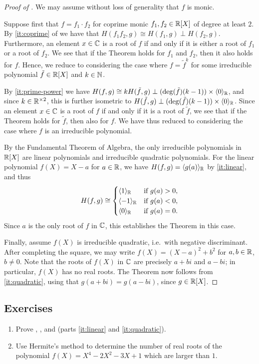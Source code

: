 \documentclass[12pt, leqno, british]{amsart}
\begin{document}
\begin{proof}[Proof of ]
We may assume without loss of generality that $f$ is monic.

Suppose first that $f = f_1 \cdot f_2$ for coprime monic $f_1, f_2 \in \mathbb R[X]$ of degree at least $2$. By \eqref{it:coprime} of  we have that $H(f_1f_2, g) \cong H(f_1, g) \perp H(f_2, g)$.
Furthermore, an element $x \in \mathbb C$ is a root of $f$ if and only if it is either a root of $f_1$ or a root of $f_2$.
We see that if the Theorem holds for $f_1$ and $f_2$, then it also holds for $f$.
Hence, we reduce to considering the case where $f = \tilde{f}^k$ for some irreducible polynomial $\tilde{f} \in \mathbb R[X]$ and $k \in \mathbb N$.

By \eqref{it:prime-power} we have $H(f, g) \cong kH(\tilde{f}, g) \perp (\deg(\tilde{f})(k-1)) \times \langle 0 \rangle_\mathbb R$, and since $k \in \mathbb R^{\times 2}$, this is further isometric to $H(\tilde{f}, g) \perp (\deg(\tilde{f})(k-1)) \times \langle 0 \rangle_\mathbb R$.
Since an element $x \in \mathbb C$ is a root of $f$ if and only if it is a root of $\tilde{f}$, we see that if the Theorem holds for $\tilde{f}$, then also for $f$.
We have thus reduced to considering the case where $f$ is an irreducible polynomial.

By the Fundamental Theorem of Algebra, the only irreducible polynomials in $\mathbb R[X]$ are linear polynomials and irreducible quadratic polynomials.
For the linear polynomial $f(X) = X - a$ for $a \in \mathbb R$, we have $H(f, g) = \langle g(a) \rangle_\mathbb R$ by \eqref{it:linear}, and thus
$$ H(f, g) \cong \begin{cases}
\langle 1 \rangle_{\mathbb R} &\text{if } g(a) > 0, \\
\langle -1 \rangle_{\mathbb R} &\text{if } g(a) < 0, \\
\langle 0 \rangle_{\mathbb R} &\text{if } g(a) = 0.
\end{cases}$$
Since $a$ is the only root of $f$ in $\mathbb C$, this establishes the Theorem in this case.

Finally, assume $f(X)$ is irreducible quadratic, i.e.~with negative discriminant.
After completing the square, we may write $f(X) = (X-a)^2 + b^2$ for $a, b \in \mathbb R$, $b \neq 0$.
Note that the roots of $f(X)$ in $\mathbb C$ are precisely $a+bi$ and $a-bi$; in particular, $f(X)$ has no real roots.
The Theorem now follows from \eqref{it:quadratic}, using that $g(a + bi) = g(a-bi)$, since $g \in \mathbb R[X]$.
\end{proof}

\subsection{Exercises}
\begin{enumerate}
\item Prove , , and  (parts \eqref{it:linear} and \eqref{it:quadratic}).
\item Use Hermite's method to determine the number of real roots of the polynomial $f(X) = X^4 - 2X^2 - 3X + 1$ which are larger than $1$.
\end{enumerate}
\end{document}
